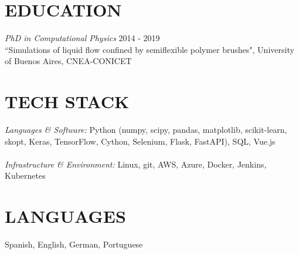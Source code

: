 \documentclass[margin]{res}
\begin{document}
\begin{resume}

\section{EDUCATION} {\sl PhD in Computational Physics}  \hfill 2014 - 2019 \\
                ``Simulations of liquid flow confined by semiflexible 
		polymer brushes", University of Buenos Aires, CNEA-CONICET  \\

 
    \section{TECH STACK} {\sl Languages \& Software:} Python (numpy, scipy, pandas, matplotlib, scikit-learn, skopt, Keras, TensorFlow, Cython, Selenium, Flask, FastAPI), SQL, Vue.js \\ \\ 
    {\sl Infrastructure \& Environment:} Linux, git, AWS, Azure, Docker, Jenkins, Kubernetes \\
               
 
\section{LANGUAGES}  Spanish, English, German, Portuguese 

 

\end{resume}
\end{document}
